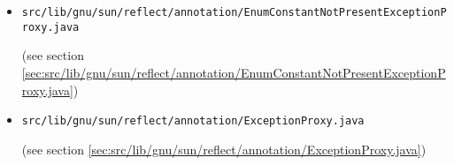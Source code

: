 \documentclass[a4paper, 10pt, titlepage]{scrartcl} %
\begin{document}
\begin{itemize}
 \item \begin{scriptsize}\verb|src|\hspace{0.0pt}\verb|/|\hspace{0.0pt}\verb|lib|\hspace{0.0pt}\verb|/|\hspace{0.0pt}\verb|gnu|\hspace{0.0pt}\verb|/|\hspace{0.0pt}\verb|sun|\hspace{0.0pt}\verb|/|\hspace{0.0pt}\verb|reflect|\hspace{0.0pt}\verb|/|\hspace{0.0pt}\verb|annotation|\hspace{0.0pt}\verb|/|\hspace{0.0pt}\verb|EnumConstantNotPresentExceptionProxy|\hspace{0.0pt}\verb|.|\hspace{0.0pt}\verb|java|\end{scriptsize} (see section \ref{sec:src/lib/gnu/sun/reflect/annotation/EnumConstantNotPresentExceptionProxy.java})
 \item \begin{scriptsize}\verb|src|\hspace{0.0pt}\verb|/|\hspace{0.0pt}\verb|lib|\hspace{0.0pt}\verb|/|\hspace{0.0pt}\verb|gnu|\hspace{0.0pt}\verb|/|\hspace{0.0pt}\verb|sun|\hspace{0.0pt}\verb|/|\hspace{0.0pt}\verb|reflect|\hspace{0.0pt}\verb|/|\hspace{0.0pt}\verb|annotation|\hspace{0.0pt}\verb|/|\hspace{0.0pt}\verb|ExceptionProxy|\hspace{0.0pt}\verb|.|\hspace{0.0pt}\verb|java|\end{scriptsize} (see section \ref{sec:src/lib/gnu/sun/reflect/annotation/ExceptionProxy.java})

\end{itemize}
\end{document}
